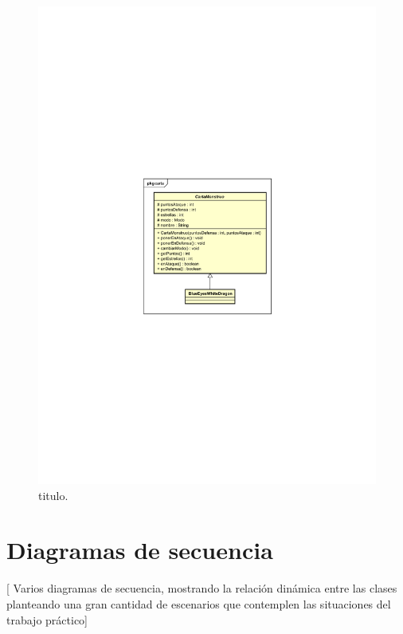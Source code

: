 \begin{figure}[H]
	\centering
	\includegraphics[scale=0.9]{includes/Implementacion_carta_monstruo}
	\caption{titulo.}
	\label{Implementacion_carta_monstruo}
\end{figure}

\clearpage
\section{Diagramas de secuencia}

[ Varios diagramas de secuencia, mostrando la relación dinámica entre las
clases planteando una gran cantidad de escenarios que contemplen las
situaciones del trabajo práctico]

